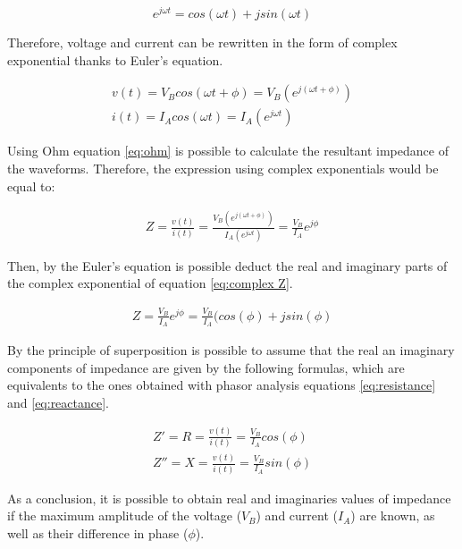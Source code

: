 \begin{equation}
	\label{eq:euler}
	e^{j\omega t} = cos(\omega t) + j sin(\omega t)
\end{equation}  

Therefore, voltage and current can be rewritten in the form of complex exponential thanks to Euler's equation. 

\begin{align}
	\label{eq:volatge euler}
	v(t) = V_B cos(\omega t + \phi) = V_B(e^{j(\omega t + \phi)}) \\
	\label{eq:current euler}
	i(t) = I_A cos(\omega t) = I_A(e^{j\omega t})	
\end{align}

Using Ohm equation \ref{eq:ohm} is possible to calculate the resultant impedance of the waveforms. Therefore, the expression using complex exponentials would be equal to:

\begin{align}
	\label{eq:complex Z}
	Z = \frac{v(t)}{i(t)} = \frac{V_B(e^{j(\omega t + \phi)})}{I_A(e^{j\omega t})} = \frac{V_B}{I_A} e^{j\phi}
\end{align}

Then, by the Euler's equation is possible deduct the real and imaginary parts of the complex exponential of equation \ref{eq:complex Z}.

\begin{align}
	\label{eq:complex Z2}
	Z = \frac{V_B}{I_A} e^{j\phi} = \frac{V_B}{I_A}(cos(\phi) + j sin(\phi)
\end{align}

By the principle of superposition is possible to assume that the real an imaginary components of impedance are given by the following formulas, which are equivalents to the ones obtained with phasor analysis equations	\ref{eq:resistance} and \ref{eq:reactance}.

\begin{align}
	\label{eq:R Z}
	Z' = R = \frac{v(t)}{i(t)} = \frac{V_B}{I_A}cos(\phi) \\
	\label{eq:X Z}
	Z'' = X = \frac{v(t)}{i(t)} = \frac{V_B}{I_A}sin(\phi)
\end{align}

As a conclusion, it is possible to obtain real and imaginaries values of impedance if the maximum amplitude of the voltage ($V_B$) and current ($I_A$) are known, as well as their difference in phase ($\phi$). 

